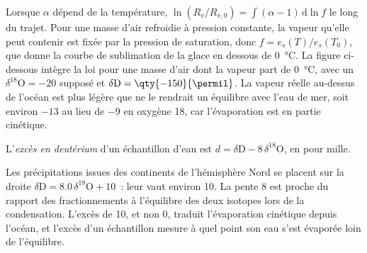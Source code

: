 Lorsque $\alpha$ dépend de la température, $\ln(R_v/R_{v,0}) = \int(\alpha - 1)\,
\mathrm d\ln f$ le long du trajet. Pour une masse d'air refroidie à pression constante,
la vapeur qu'elle peut contenir est fixée par la pression de saturation, donc $f =
e_s(T)/e_s(T_0)$, que donne la courbe de sublimation de la glace en dessous de
\qty{0}{\celsius}. La figure ci-dessous intègre la loi pour une masse d'air dont
la vapeur part de \qty{0}{\celsius}, avec un $\delta^{18}\mathrm O = -20$ supposé
et $\delta\mathrm D = \qty{-150}{\permil}$. La vapeur réelle au-dessus de l'océan est
plus légère que ne le rendrait un équilibre avec l'eau de mer, soit environ $-13$ au lieu de
\qty{-9}{\permil} en oxygène 18, car l'évaporation est en partie cinétique.

\begin{definition}\label{def:b3:stable-isotopes:d-excess}
L'\emph{excès en deutérium} d'un échantillon d'eau est $d =
\delta\mathrm D - 8\,\delta^{18}\mathrm O$, en pour mille.
\end{definition}

Les précipitations issues des continents de l'hémisphère Nord se placent sur la droite
$\delta\mathrm D = 8.0\,\delta^{18}\mathrm O + 10$~: leur  vaut environ
\qty{10}{\permil}. La pente 8 est proche du rapport des fractionnements à l'équilibre
des deux isotopes lors de la condensation. L'excès de 10, et non 0,
traduit l'évaporation cinétique depuis l'océan, et l'excès d'un échantillon
mesure à quel point son eau s'est évaporée loin de l'équilibre.

